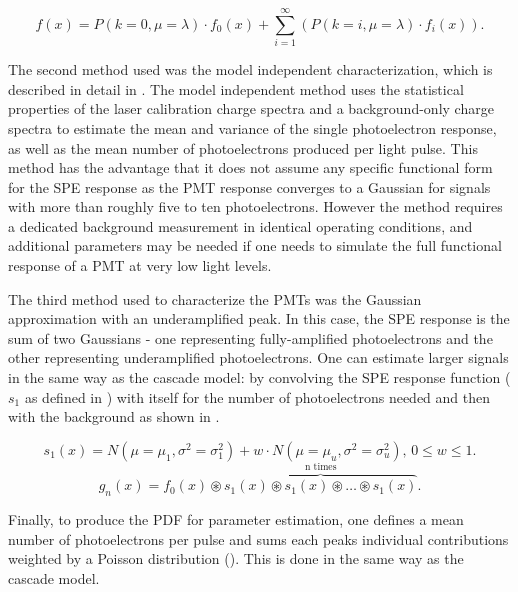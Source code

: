 \begin{equation}
        \label{cascade_fit_full}
        f(x) = P(k=0, \mu=\lambda) \cdot f_0(x) + \sum^{\infty}_{i=1} (P(k=i, \mu=\lambda) \cdot f_i(x)).
\end{equation}

The second method used was the model independent characterization, which is described in detail in .  The model independent method uses the statistical properties of the laser calibration charge spectra and a background-only charge spectra to estimate the mean and variance of the single photoelectron response, as well as the mean number of photoelectrons produced per light pulse. This method has the advantage that it does not assume any specific functional form for the SPE response as the PMT response converges to a Gaussian for signals with more than roughly five to ten photoelectrons. However the method requires a dedicated background measurement in identical operating conditions, and additional parameters may be needed if one needs to simulate the full functional response of a PMT at very low light levels.

The third method used to characterize the PMTs was the Gaussian approximation with an underamplified peak.  In this case, the SPE response is the sum of two  Gaussians - one representing fully-amplified photoelectrons and the other representing underamplified photoelectrons.  One can estimate larger signals in the same way as the cascade model: by convolving the SPE response function ($s_1$ as defined in ) with itself for the number of photoelectrons needed and then with the background as shown in .  


\begin{equation}
        \label{gaussian_spe}
        s_1(x) = N(\mu=\mu_1, \sigma^2=\sigma^2_1) + w \cdot N(\mu=\mu_u, \sigma^2=\sigma^2_u), \, 0 \leq w \leq 1.
\end{equation}
\begin{equation}
        \label{gaussian_mpe}
        g_n(x) = f_0(x) \circledast \overbrace{s_1(x) \circledast s_1(x) \circledast \ldots \circledast s_1(x)}^{\text{n times}}.
\end{equation}

Finally, to produce the PDF for parameter estimation, one defines a mean number of photoelectrons per pulse and sums each peaks individual contributions weighted by a Poisson distribution ().  This is done in the same way as the cascade model.

